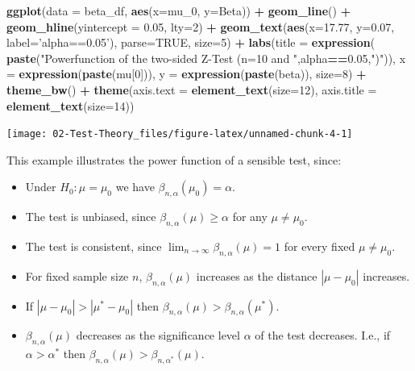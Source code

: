 \documentclass[]{book}
\newenvironment{Shaded}{\begin{snugshade}}{\end{snugshade}}
\newcommand{\DataTypeTok}[1]{\textcolor[rgb]{0.13,0.29,0.53}{#1}}
\newcommand{\DecValTok}[1]{\textcolor[rgb]{0.00,0.00,0.81}{#1}}
\newcommand{\FloatTok}[1]{\textcolor[rgb]{0.00,0.00,0.81}{#1}}
\newcommand{\KeywordTok}[1]{\textcolor[rgb]{0.13,0.29,0.53}{\textbf{#1}}}
\newcommand{\NormalTok}[1]{#1}
\newcommand{\OperatorTok}[1]{\textcolor[rgb]{0.81,0.36,0.00}{\textbf{#1}}}
\newcommand{\OtherTok}[1]{\textcolor[rgb]{0.56,0.35,0.01}{#1}}
\newcommand{\StringTok}[1]{\textcolor[rgb]{0.31,0.60,0.02}{#1}}
\providecommand{\tightlist}{%
  \setlength{\itemsep}{0pt}\setlength{\parskip}{0pt}}
\theoremstyle{definition}
\theoremstyle{definition}
\theoremstyle{definition}
\theoremstyle{remark}
\begin{document}
\begin{Shaded}
\begin{Highlighting}[]
\KeywordTok{ggplot}\NormalTok{(}\DataTypeTok{data =}\NormalTok{ beta_df, }\KeywordTok{aes}\NormalTok{(}\DataTypeTok{x=}\NormalTok{mu_}\DecValTok{0}\NormalTok{, }\DataTypeTok{y=}\NormalTok{Beta)) }\OperatorTok{+}
\StringTok{  }\KeywordTok{geom_line}\NormalTok{() }\OperatorTok{+}
\StringTok{  }\KeywordTok{geom_hline}\NormalTok{(}\DataTypeTok{yintercept =} \FloatTok{0.05}\NormalTok{, }\DataTypeTok{lty=}\DecValTok{2}\NormalTok{) }\OperatorTok{+}\StringTok{ }
\StringTok{  }\KeywordTok{geom_text}\NormalTok{(}\KeywordTok{aes}\NormalTok{(}\DataTypeTok{x=}\FloatTok{17.77}\NormalTok{, }\DataTypeTok{y=}\FloatTok{0.07}\NormalTok{, }\DataTypeTok{label=}\StringTok{'alpha==0.05'}\NormalTok{), }\DataTypeTok{parse=}\OtherTok{TRUE}\NormalTok{, }\DataTypeTok{size=}\DecValTok{5}\NormalTok{) }\OperatorTok{+}
\StringTok{  }\KeywordTok{labs}\NormalTok{(}\DataTypeTok{title =} \KeywordTok{expression}\NormalTok{(}
    \KeywordTok{paste}\NormalTok{(}\StringTok{"Powerfunction of the two-sided Z-Test (n=10 and "}\NormalTok{,alpha}\OperatorTok{==}\FloatTok{0.05}\NormalTok{,}\StringTok{")"}\NormalTok{)), }
       \DataTypeTok{x =} \KeywordTok{expression}\NormalTok{(}\KeywordTok{paste}\NormalTok{(mu[}\DecValTok{0}\NormalTok{])),}
       \DataTypeTok{y =} \KeywordTok{expression}\NormalTok{(}\KeywordTok{paste}\NormalTok{(beta)), }\DataTypeTok{size=}\DecValTok{8}\NormalTok{)    }\OperatorTok{+}
\StringTok{  }\KeywordTok{theme_bw}\NormalTok{() }\OperatorTok{+}
\StringTok{  }\KeywordTok{theme}\NormalTok{(}\DataTypeTok{axis.text  =} \KeywordTok{element_text}\NormalTok{(}\DataTypeTok{size=}\DecValTok{12}\NormalTok{),}
           \DataTypeTok{axis.title =} \KeywordTok{element_text}\NormalTok{(}\DataTypeTok{size=}\DecValTok{14}\NormalTok{))}
\end{Highlighting}
\end{Shaded}

\begin{center}\texttt{[image: 02-Test-Theory\_files/figure-latex/unnamed-chunk-4-1]} \end{center}

This example illustrates the power function of a sensible test, since:

\begin{itemize}
\tightlist
\item
  Under \(H_0:\mu=\mu_0\) we have \(\beta_{n,\alpha}(\mu_0)=\alpha\).
\item
  The test is unbiased, since \(\beta_{n,\alpha}(\mu)\geq\alpha\) for any \(\mu\neq\mu_0\).
\item
  The test is consistent, since \(\lim_{n\rightarrow\infty} \beta_{n,\alpha}(\mu)=1\) for every fixed \(\mu\neq \mu_0\).
\item
  For fixed sample size \(n\), \(\beta_{n,\alpha}(\mu)\) increases as the distance \(|\mu-\mu_0|\) increases.
\item
  If \(|\mu-\mu_0|>|\mu^*-\mu_0|\) then \(\beta_{n,\alpha}(\mu)>\beta_{n,\alpha}(\mu^*)\).
\item
  \(\beta_{n,\alpha}(\mu)\) decreases as the significance level \(\alpha\) of the test decreases. I.e., if \(\alpha>\alpha^*\) then
  \(\beta_{n,\alpha}(\mu)>\beta_{n,\alpha^*}(\mu)\).
\end{itemize}
\end{document}
